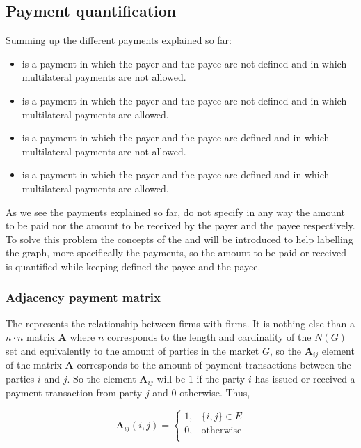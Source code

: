 \documentclass[12pt]{article}
\begin{document}
\begin{multicols}{2}
\subsection{Payment quantification} \label{pq}
Summing up the different payments explained so far:

\begin{itemize}
  \item {} is a payment in which the payer and the payee are not defined and in which multilateral payments are not allowed.
  \item {} is a payment in which the payer and the payee are not defined and in which multilateral payments are allowed.
  \item {} is a payment in which the payer and the payee are defined and in which multilateral payments are not allowed.
  \item {} is a payment in which the payer and the payee are defined and in which multilateral payments are allowed.
\end{itemize}

As we see the payments explained so far, do not specify in any way the amount to be paid nor the amount to be received by the payer and the payee respectively. To solve this problem the concepts of the  and  will be introduced to help labelling the graph, more specifically the payments, so the amount to be paid or received is quantified while keeping defined the payee and the payee. 

\subsubsection{Adjacency payment matrix} \label{apm}
The  represents the relationship between firms with firms. It is nothing else than a $n \cdot n$ matrix $\textbf{A}$ where $n$ corresponds to the length and cardinality of the $N(G)$ set and equivalently to the amount of parties in the market $G$, so the $\textbf{A}_{ij}$ element of the matrix $\textbf{A}$ corresponds to the amount of payment transactions between the parties $i$ and $j$. So the element $\textbf{A}_{ij}$ will be $1$ if the party $i$ has issued or received a payment transaction from party $j$ and $0$ otherwise. Thus,

\begin{equation} \label{eq5}
\textbf{A}_{ij}(i, j) = \begin{cases}
			1, & \{i, j\} \in E\\
            0, & \text{otherwise}\\
		 \end{cases}
\end{equation}


\end{multicols}
\end{document}

